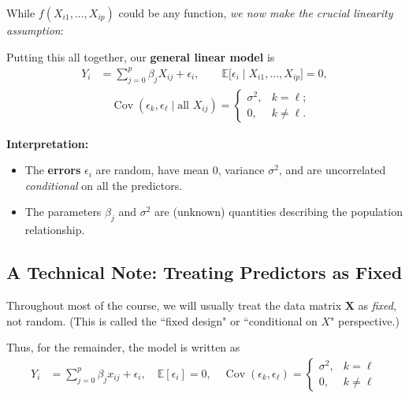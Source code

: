 \documentclass[12pt]{article}
\begin{document}
While $f(X_{i1},\ldots,X_{ip})$ could be any function, \emph{we now make the crucial linearity assumption}:
\begin{center}
\end{center}

\noindent
Putting this all together, our \textbf{general linear model} is
\begin{align}
Y_i &= \sum_{j=0}^p \beta_j X_{ij} + \epsilon_i, \qquad
\mathbb{E}\big[\epsilon_i \mid X_{i1},\ldots,X_{ip}\big] = 0, \\
&\quad \operatorname{Cov}(\epsilon_k,\epsilon_\ell \mid \text{all }X_{ij}) = 
\begin{cases}
\sigma^2, & k = \ell; \\
0, & k \neq \ell.
\end{cases}
\end{align}

\textbf{Interpretation:}
\begin{itemize}
    \item The \textbf{errors} $\epsilon_i$ are random, have mean $0$, variance $\sigma^2$, and are uncorrelated \emph{conditional} on all the predictors.
    \item The parameters $\beta_j$ and $\sigma^2$ are (unknown) quantities describing the population relationship.
\end{itemize}

\subsection*{A Technical Note: Treating Predictors as Fixed}

Throughout most of the course, we will usually treat the data matrix $\boldsymbol{X}$ as \emph{fixed}, not random. (This is called the ``fixed design" or ``conditional on $X$" perspective.)

Thus, for the remainder, the model is written as
\begin{align}
Y_i &= \sum_{j=0}^{p} \beta_j x_{ij} + \epsilon_i, \quad 
\mathbb{E}[\epsilon_i] = 0, \quad
\operatorname{Cov}(\epsilon_k, \epsilon_\ell) =
\begin{cases}
\sigma^2, & k = \ell \\
0,        & k \neq \ell
\end{cases}
\end{align}
\end{document}
